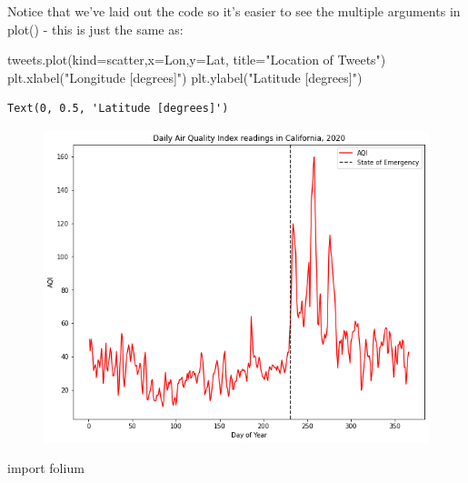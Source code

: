 \documentclass[
  letterpaper,
  DIV=11,
  numbers=noendperiod]{scrreprt}
\newenvironment{Shaded}{\begin{snugshade}}{\end{snugshade}}
\newcommand{\ImportTok}[1]{\textcolor[rgb]{0.00,0.46,0.62}{#1}}
\newcommand{\NormalTok}[1]{\textcolor[rgb]{0.00,0.23,0.31}{#1}}
\newcommand{\OperatorTok}[1]{\textcolor[rgb]{0.37,0.37,0.37}{#1}}
\newcommand{\StringTok}[1]{\textcolor[rgb]{0.13,0.47,0.30}{#1}}
\begin{document}
Notice that we've laid out the code so it's easier to see the multiple
arguments in plot() - this is just the same as:

\begin{Shaded}
\begin{Highlighting}[]
\NormalTok{tweets.plot(kind}\OperatorTok{=}\StringTok{\textquotesingle{}scatter\textquotesingle{}}\NormalTok{,x}\OperatorTok{=}\StringTok{\textquotesingle{}Lon\textquotesingle{}}\NormalTok{,y}\OperatorTok{=}\StringTok{\textquotesingle{}Lat\textquotesingle{}}\NormalTok{, title}\OperatorTok{=}\StringTok{"Location of Tweets"}\NormalTok{)}
\NormalTok{plt.xlabel(}\StringTok{"Longitude [degrees]"}\NormalTok{)}
\NormalTok{plt.ylabel(}\StringTok{"Latitude [degrees]"}\NormalTok{)}
\end{Highlighting}
\end{Shaded}

\begin{verbatim}
Text(0, 0.5, 'Latitude [degrees]')
\end{verbatim}

\begin{figure}[H]

{\centering \includegraphics{notebooks/W03. Spatial Data_files/figure-pdf/cell-10-output-2.png}

}

\end{figure}

\begin{Shaded}
\begin{Highlighting}[]
\ImportTok{import}\NormalTok{ folium}
\end{Highlighting}
\end{Shaded}
\end{document}
